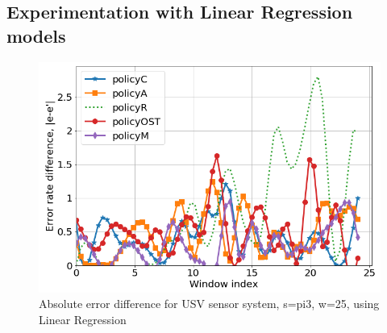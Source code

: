 \documentclass{mpaper}
\begin{document}
\subsection{Experimentation with Linear Regression models}

\begin{figure}[h]
    \centering
    \includegraphics[scale=0.33]{imgs/lin_reg_pi3_w25.png}
    \caption{Absolute error difference for USV sensor system, s=pi3, w=25, using Linear Regression}
    \label{fig:err_lin_reg_pi3}
\end{figure}
\end{document}
